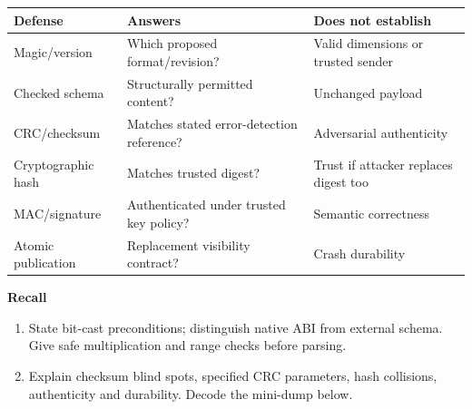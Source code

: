{\def\LTcaptype{none} %
\begin{longtable}[]{@{}
  >{\raggedright\arraybackslash}p{}
  >{\raggedright\arraybackslash}p{}
  >{\raggedright\arraybackslash}p{}@{}}
\toprule\noalign{}
\begin{minipage}[b]{\linewidth}\raggedright
Defense
\end{minipage} & \begin{minipage}[b]{\linewidth}\raggedright
Answers
\end{minipage} & \begin{minipage}[b]{\linewidth}\raggedright
Does not establish
\end{minipage} \\
\midrule\noalign{}
\endhead
\bottomrule\noalign{}
\endlastfoot
Magic/version & Which proposed format/revision? & Valid dimensions or trusted sender \\
Checked schema & Structurally permitted content? & Unchanged payload \\
CRC/checksum & Matches stated error-detection reference? & Adversarial authenticity \\
Cryptographic hash & Matches trusted digest? & Trust if attacker replaces digest too \\
MAC/signature & Authenticated under trusted key policy? & Semantic correctness \\
Atomic publication & Replacement visibility contract? & Crash durability \\
\end{longtable}
}

\textbf{Recall}

\begin{enumerate}
\def\labelenumi{\arabic{enumi}.}
\setcounter{enumi}{23}
\tightlist
\item
  State bit-cast preconditions; distinguish native ABI from external schema. Give safe multiplication and range checks before parsing.
\item
  Explain checksum blind spots, specified CRC parameters, hash collisions, authenticity and durability. Decode the mini-dump below.
\end{enumerate}

